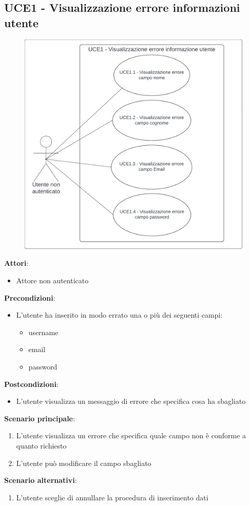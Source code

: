 \subsection{UCE1 - Visualizzazione errore informazioni utente}\label{usecase:e_1}
\begin{figure}[H]
    \centering
    \includegraphics[width=0.75\linewidth]{ucd/UCED1.png}
\end{figure}
\textbf{Attori}:
\begin{itemize}
    \item Attore non autenticato
\end{itemize}
\textbf{Precondizioni}:
\begin{itemize}
    \item L'utente ha inserito in modo errato una o più dei seguenti campi:
    \begin{itemize}
        \item username
        \item email
        \item password
    \end{itemize}
\end{itemize}
\textbf{Postcondizioni}:
\begin{itemize}
    \item L'utente visualizza un messaggio di errore che specifica cosa ha sbagliato
\end{itemize}
\textbf{Scenario principale}:
\begin{enumerate}
    \item L'utente visualizza un errore che specifica quale campo non è conforme a quanto richiesto
    \item L'utente può modificare il campo sbagliato
\end{enumerate}
\textbf{Scenario alternativi}:
\begin{enumerate}
    \item L'utente sceglie di annullare la procedura di inserimento dati
\end{enumerate}




\newpage